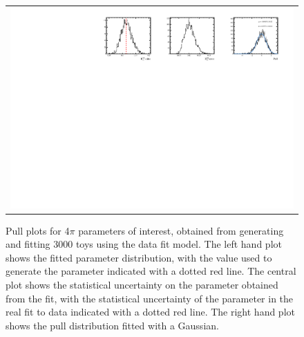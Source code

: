 \begin{figure}
\begin{tabular}{c}
\includegraphics[width=\textwidth]{ANA_resources/Plots/Data_fit/FitterBias//R_ds_pipipipi_run2.pdf} \\
  \end{tabular}
  \caption{Pull plots for 4$\pi$ parameters of interest, obtained from generating and fitting 3000 toys using the data fit model. The left hand plot shows the fitted parameter distribution, with the value used to generate the parameter indicated with a dotted red line. The central plot shows the statistical uncertainty on the parameter obtained from the fit, with the statistical uncertainty of the parameter in the real fit to data indicated with a dotted red line. The right hand plot shows the pull distribution fitted with a Gaussian.}
\label{fig:4pi_pulls}
\end{figure}
